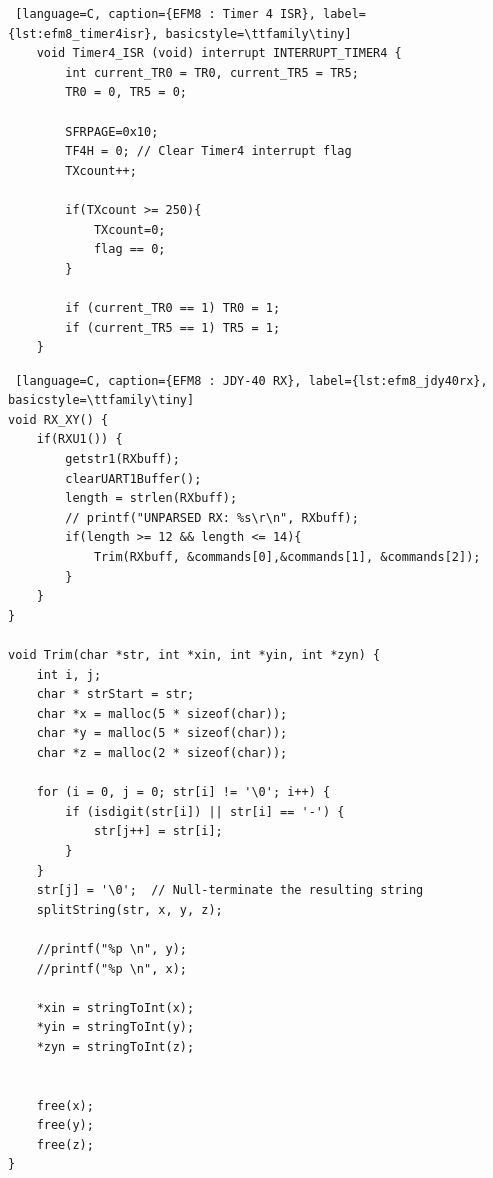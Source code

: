 \documentclass{article}
\begin{document}
\begin{lstlisting} [language=C, caption={EFM8 : Timer 4 ISR}, label={lst:efm8_timer4isr}, basicstyle=\ttfamily\tiny]
    void Timer4_ISR (void) interrupt INTERRUPT_TIMER4 {
        int current_TR0 = TR0, current_TR5 = TR5;
        TR0 = 0, TR5 = 0;

        SFRPAGE=0x10;
        TF4H = 0; // Clear Timer4 interrupt flag
        TXcount++;

        if(TXcount >= 250){
            TXcount=0;
            flag == 0;
        }

        if (current_TR0 == 1) TR0 = 1;
        if (current_TR5 == 1) TR5 = 1;
    }
\end{lstlisting}

\begin{lstlisting} [language=C, caption={EFM8 : JDY-40 RX}, label={lst:efm8_jdy40rx}, basicstyle=\ttfamily\tiny]
void RX_XY() {
    if(RXU1()) {
	    getstr1(RXbuff);
	    clearUART1Buffer();
	    length = strlen(RXbuff);
        // printf("UNPARSED RX: %s\r\n", RXbuff);
	    if(length >= 12 && length <= 14){
	    	Trim(RXbuff, &commands[0],&commands[1], &commands[2]);
	    }
	}
}

void Trim(char *str, int *xin, int *yin, int *zyn) {
    int i, j;
    char * strStart = str;
    char *x = malloc(5 * sizeof(char));
    char *y = malloc(5 * sizeof(char));
    char *z = malloc(2 * sizeof(char));

    for (i = 0, j = 0; str[i] != '\0'; i++) {
        if (isdigit(str[i]) || str[i] == '-') {
            str[j++] = str[i];
        }
    }
    str[j] = '\0';  // Null-terminate the resulting string
    splitString(str, x, y, z);

    //printf("%p \n", y);
    //printf("%p \n", x);

    *xin = stringToInt(x);
    *yin = stringToInt(y);
    *zyn = stringToInt(z);


    free(x);
    free(y);
    free(z);
}
\end{lstlisting}
\end{document}
